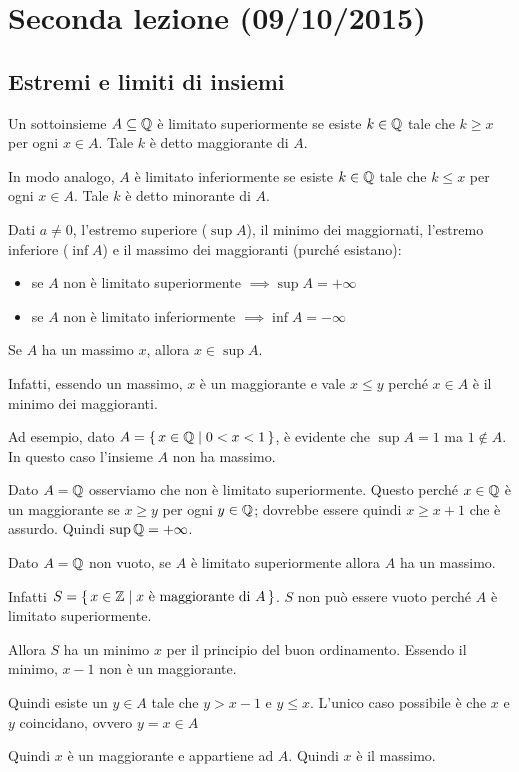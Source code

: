 \chapter{Seconda lezione (09/10/2015)}

\section{Estremi e limiti di insiemi}

\begin{definition}
Un sottoinsieme $A \subseteq \mathbb Q$ è limitato superiormente se esiste $k \in \mathbb Q$ tale che $k \ge x$ per ogni $x \in A$. Tale $k$ è detto maggiorante di $A$. 

In modo analogo, $A$ è limitato inferiormente se esiste $k \in \mathbb Q$ tale che $k \le x$ per ogni $x \in A$. Tale $k$ è detto minorante di $A$.
\end{definition}

Dati $a \neq 0$, l'estremo superiore ($\sup A$), il minimo dei maggiornati, l'estremo inferiore ($\inf A$) e il massimo dei maggioranti (purché esistano):
\begin{itemize}
\item se $A$ non è limitato superiormente $ \implies \sup A = + \infty$
\item se $A$ non è limitato inferiormente $ \implies \inf A = - \infty$
\end{itemize}

\begin{remark}
Se $A$ ha un massimo $x$, allora $x \in \sup A$.

Infatti, essendo un massimo, $x$ è un maggiorante e vale $x \le y$ perché $x \in A$ è il minimo dei maggioranti.
\end{remark}

Ad esempio, dato $A = \set{x \in \mathbb Q| 0 < x < 1}$, è evidente che $\sup A = 1$ ma $1 \notin A$. In questo caso l'insieme $A$ non ha massimo.

\begin{example}
Dato $A = \mathbb Q$ osserviamo che non è limitato superiormente. Questo perché $x \in \mathbb Q$ è un maggiorante se $x \ge y$ per ogni $y \in \mathbb Q$; dovrebbe essere quindi $x \ge x + 1$ che è assurdo. Quindi $\sup \mathbb Q = +\infty$.
\end{example}

\begin{example}
Dato $A = \mathbb Q$ non vuoto, se $A$ è limitato superiormente allora $A$ ha un massimo.

Infatti $S = \set{x \in \mathbb Z| x \text{ è maggiorante di } A}$. $S$ non può essere vuoto perché $A$ è limitato superiormente.

Allora $S$ ha un minimo $x$ per il principio del buon ordinamento. Essendo il minimo, $x-1$ non è un maggiorante.

Quindi esiste un $y \in A$ tale che $y > x-1$ e $y \le x$. L'unico caso possibile è che $x$ e $y$ coincidano, ovvero $y = x \in A$

Quindi $x$ è un maggiorante e appartiene ad $A$. Quindi $x$ è il massimo.
\end{example}

